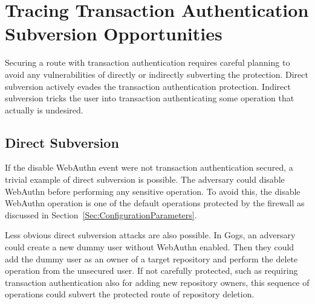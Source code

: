 


\section{Tracing Transaction Authentication \newline Subversion Opportunities}


Securing a route with transaction authentication requires careful planning to avoid any vulnerabilities of directly or indirectly subverting the protection. Direct subversion actively evades the transaction authentication protection. Indirect subversion tricks the user into transaction authenticating some operation that actually is undesired.

\subsection{Direct Subversion}
If the disable WebAuthn event were not transaction authentication secured, a trivial example of direct subversion is possible. The adversary could disable WebAuthn before performing any sensitive operation. To avoid this, the disable WebAuthn operation is one of the default operations protected by the firewall as discussed in Section~\ref{Sec:ConfigurationParameters}.


Less obvious direct subversion attacks are also possible. In Gogs, an adversary could create a new dummy user without WebAuthn enabled. Then they could add the dummy user as an owner of a target repository and perform the delete operation from the unsecured user. If not carefully protected, such as requiring transaction authentication also for adding new repository owners, this sequence of operations could subvert the protected route of repository deletion.

